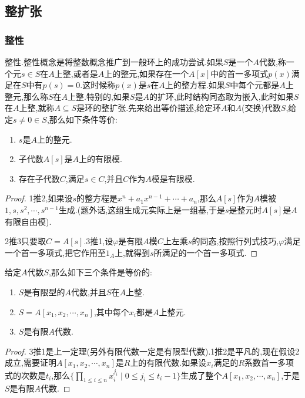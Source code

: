 \subsection{整扩张}
\subsubsection{整性}

整性.整性概念是将整数概念推广到一般环上的成功尝试.如果$S$是一个$A$代数,称一个元$s\in S$在$A$上整,或者是$A$上的整元,如果存在一个$A[x]$中的首一多项式$p(x)$满足在$S$中有$p(s)=0$.这时候称$p(x)$是$s$在$A$上的整方程.如果$S$中每个元都是$A$上整元,那么称$S$在$A$上整.特别的,如果$S$是$A$的扩环,此时结构同态取为嵌入,此时如果$S$在$A$上整,就称$A\subseteq S$是环的整扩张.先来给出等价描述,给定环$A$和$A$(交换)代数$S$,给定$s\not=0\in S$,那么如下条件等价:
\begin{enumerate}
	\item $s$是$A$上的整元.
	\item 子代数$A[s]$是$A$上的有限模.
	\item 存在子代数$C$,满足$s\in C$,并且$C$作为$A$模是有限模.
\end{enumerate}
\begin{proof}
	
	1推2,如果设$s$的整方程是$x^n+a_1x^{n-1}+\cdots+a_n$,那么$A[s]$作为$A$模被$1,s,s^2,\cdots,s^{n-1}$生成.(题外话,这组生成元实际上是一组基,于是$s$是整元时$A[s]$是$A$有限自由模).
	
	2推3只要取$C=A[s]$.3推1,设$\varphi$是有限$A$模$C$上左乘$s$的同态,按照行列式技巧,$\varphi$满足一个首一多项式,把它作用至$1_A$上,就得到$s$所满足的一个首一多项式.
\end{proof}

给定$A$代数$S$,那么如下三个条件是等价的:
\begin{enumerate}
	\item $S$是有限型的$A$代数,并且$S$在$A$上整.
	\item $S=A[x_1,x_2,\cdots,x_n]$,其中每个$x_i$都是$A$上整元.
	\item $S$是有限$A$代数.
\end{enumerate}
\begin{proof}
	
	3推1是上一定理(另外有限代数一定是有限型代数).1推2是平凡的,现在假设2成立,需要证明$A[x_1,x_2,\cdots,x_n]$是$R$上的有限代数.如果设$x_i$满足的$R$系数首一多项式的次数是$t_i$,那么$\{\prod_{1\le i\le n}x_i^{j_i}\mid 0\le j_i\le t_i-1\}$生成了整个$A[x_1,x_2,\cdots,x_n]$,于是$S$是有限$A$代数.
\end{proof}

